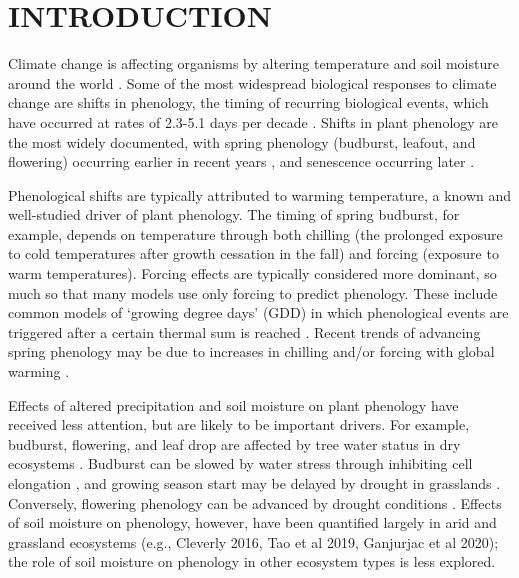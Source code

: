 \documentclass{article}
\begin{document}
\section* {INTRODUCTION} 
\par Climate change is affecting organisms by altering temperature and soil moisture around the world \citep{parmesan2006,chen2011}. Some of the most widespread biological responses to climate change are shifts in phenology, the timing of recurring biological events, which have occurred at rates of 2.3-5.1 days per decade \citep{parmesan2006,poloczanska2013,root2003}. Shifts in plant phenology are the most widely documented, with spring phenology (budburst, leafout, and flowering) occurring earlier in recent years \citep{wolkovich2012}, and senescence occurring later \citep{taylor2008,delpierre2009}. 
\par Phenological shifts are typically attributed to warming temperature, a known and well-studied driver of plant phenology. The timing of spring budburst, for example, depends on temperature through both chilling (the prolonged exposure to cold temperatures after growth cessation in the fall) and forcing (exposure to warm temperatures). Forcing effects are typically considered more dominant, so much so that many models use only forcing to predict phenology. These include common models of `growing degree days' (GDD) in which phenological events are triggered after a certain thermal sum is reached \citep[e.g., ][]{olsson2014process}. Recent trends of advancing spring phenology may be due to increases in chilling and/or forcing with global warming \citep{fujisawa2010, ibanez2010,cook2012b}. %
\par Effects of altered precipitation and soil moisture on plant phenology have received less attention, but are likely to be important drivers. For example, budburst, flowering, and leaf drop are affected by tree water status in dry ecosystems \citep[e.g., ][]{essiamah1986,reich1984, van1993}. Budburst can be slowed by water stress through inhibiting cell elongation \citep{essiamah1986}, and growing season start may be delayed by drought in grasslands \cite{cui2017}. Conversely, flowering phenology can be advanced by drought conditions \citep{hamann2018}. Effects of soil moisture on phenology, however, have been quantified largely in arid and grassland ecosystems (e.g., Cleverly 2016, Tao et al 2019, Ganjurjac et al 2020); the role of soil moisture on phenology in other ecosystem types is less explored. 
\end{document}
